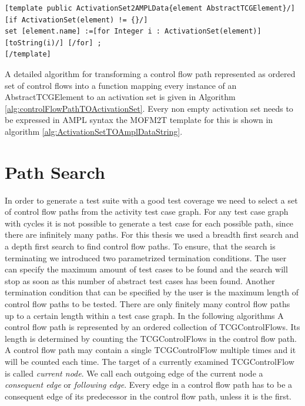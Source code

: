 \begin{algorithm}
\begin{lstlisting}
[template public ActivationSet2AMPLData{element AbstractTCGElement}/]
[if ActivationSet(element) != {}/]
set [element.name] :=[for Integer i : ActivationSet(element)] [toString(i)/] [/for] ;
[/template]
\end{lstlisting}
\caption{Text template for printing an activation set in AMPL syntax}
\label{alg:ActivationSetTOAmplDataString}
\end{algorithm}
A detailed algorithm for transforming a control flow path represented as ordered set of control flows into a function mapping every instance of an AbstractTCGElement to an activation set is given in Algorithm \ref{alg:controlFlowPathTOActivationSet}. Every non empty activation set needs to be expressed in AMPL syntax the MOFM2T template for this is shown in algorithm \ref{alg:ActivationSetTOAmplDataString}.

\section{Path Search}
\label{sec:pathsearch}
In order to generate a test suite with a good test coverage we need to select a set of control flow paths from the activity test case graph. For any test case graph with cycles it is not possible to generate a test case for each possible path, since there are infinitely many paths. For this thesis we used a breadth first search and a depth first search to find control flow paths. To ensure, that the search is terminating we introduced two parametrized termination conditions. The user can specify the maximum amount of test cases to be found and the search will stop as soon as this number of abstract test cases has been found. Another termination condition that can be specified by the user is the maximum length of control flow paths to be tested. There are only finitely many control flow paths up to a certain length within a test case graph. In the following algorithms A control flow path is represented by an ordered collection of TCGControlFlows. Its length is determined by counting the TCGControlFlows in the control flow path. A control flow path may contain a single TCGControlFlow multiple times and it will be counted each time. The target of a currently examined TCGControlFlow is called \emph{current node}. We call each outgoing edge of the current node a \emph{consequent edge} or \emph{following edge}. Every edge in a control flow path has to be a consequent edge of its predecessor in the control flow path, unless it is the first.
